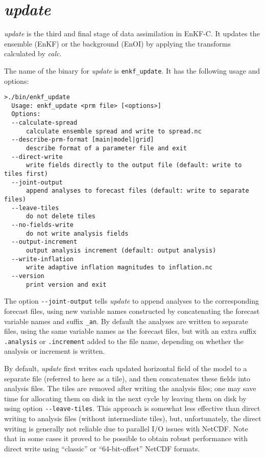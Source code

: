 \documentclass[11pt]{report}
\begin{document}
\section{\emph{update}}

\emph{update} is the third and final stage of data assimilation in EnKF-C.
It updates the ensemble (EnKF) or the background (EnOI) by applying the transforms calculated by \emph{calc}.

The name of the binary for \emph{update} is \verb|enkf_update|.
It has the following usage and options:
\begin{Verbatim}[frame=single,fontsize=\footnotesize]
>./bin/enkf_update
  Usage: enkf_update <prm file> [<options>]
  Options:
  --calculate-spread
      calculate ensemble spread and write to spread.nc
  --describe-prm-format [main|model|grid]
      describe format of a parameter file and exit
  --direct-write
      write fields directly to the output file (default: write to tiles first)
  --joint-output
      append analyses to forecast files (default: write to separate files)
  --leave-tiles
      do not delete tiles
  --no-fields-write
      do not write analysis fields
  --output-increment
      output analysis increment (default: output analysis)
  --write-inflation
      write adaptive inflation magnitudes to inflation.nc
  --version
      print version and exit
\end{Verbatim}

The option \verb|--joint-output| tells \emph{update} to append analyses to the corresponding forecast files, using new variable names constructed by concatenating the forecast variable names and suffix \verb|_an|.
By default the analyses are written to separate files, using the same variable names as the forecast files, but with an extra suffix \verb|.analysis| or \verb|.increment| added to the file name, depending on whether the analysis or increment is written.

By default, \emph{update} first writes each updated horizontal field of the model to a separate file (referred to here as a tile), and then concatenates these fields into analysis files.
The tiles are removed after writing the analysis files; one may save time for allocating them on disk in the next cycle by leaving them on disk by using option \verb|--leave-tiles|.
This approach is somewhat less effective than direct writing to analysis files (without intermediate tiles), but, unfortunately, the direct writing is generally not reliable due to parallel I/O issues with NetCDF.
Note that in some cases it proved to be possible to obtain robust performance with direct write using ``classic'' or ``64-bit-offset'' NetCDF formats.
\end{document}
